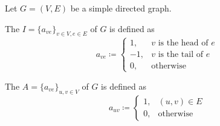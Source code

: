 \begin{definition}\label{def:graph_matrices}
  Let \( G = (V, E) \) be a simple directed graph.
  \begin{defenum}
    \cite[chapter 1, section 2.1]{Gondran1984} The  \( I = \{ a_{ve} \}_{v \in V, e \in E} \) of \( G \) is defined as
    \begin{equation*}
      a_{ve} \coloneqq \begin{cases}
        1, &v \text{ is the head of } e \\
        -1, &v \text{ is the tail of } e \\
        0, &\text{otherwise}
      \end{cases}
    \end{equation*}

    \cite[chapter 1, section 2.3]{Gondran1984} The  \( A = \{ a_{ve} \}_{u, v \in V} \) of \( G \) is defined as
    \begin{equation*}
      a_{uv} \coloneqq \begin{cases}
        1, &(u, v) \in E \\
        0, &\text{otherwise}
      \end{cases}
    \end{equation*}
  \end{defenum}
\end{definition}

